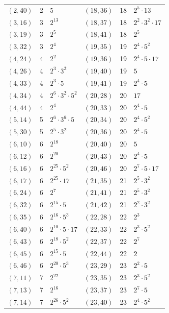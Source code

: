 \documentclass[11pt]{article}
\begin{document}
\begin{longtable}{@{}lrl@{\qquad}lrl@{}}
$(2,40)$ & 2 & $5$ & $(18,36)$ & 18 & $2^{5}\cdot 13$\\
$(3,16)$ & 3 & $2^{13}$ & $(18,37)$ & 18 & $2^{2}\cdot 3^{2}\cdot 17$\\
$(3,19)$ & 3 & $2^{5}$ & $(18,41)$ & 18 & $2^{5}$\\
$(3,32)$ & 3 & $2^{4}$ & $(19,35)$ & 19 & $2^{4}\cdot 5^{2}$\\
$(4,24)$ & 4 & $2^{2}$ & $(19,36)$ & 19 & $2^{4}\cdot 5\cdot 17$\\
$(4,26)$ & 4 & $2^{3}\cdot 3^{2}$ & $(19,40)$ & 19 & $5$\\
$(4,33)$ & 4 & $2^{3}\cdot 5$ & $(19,41)$ & 19 & $2^{4}\cdot 5$\\
$(4,34)$ & 4 & $2^{6}\cdot 3^{2}\cdot 5^{2}$ & $(20,28)$ & 20 & $17$\\
$(4,44)$ & 4 & $2^{4}$ & $(20,33)$ & 20 & $2^{4}\cdot 5$\\
$(5,14)$ & 5 & $2^{6}\cdot 3^{6}\cdot 5$ & $(20,34)$ & 20 & $2^{4}\cdot 5^{2}$\\
$(5,30)$ & 5 & $2^{5}\cdot 3^{2}$ & $(20,36)$ & 20 & $2^{4}\cdot 5$\\
$(6,10)$ & 6 & $2^{18}$ & $(20,40)$ & 20 & $5$\\
$(6,12)$ & 6 & $2^{20}$ & $(20,43)$ & 20 & $2^{4}\cdot 5$\\
$(6,16)$ & 6 & $2^{25}\cdot 5^{2}$ & $(20,46)$ & 20 & $2^{7}\cdot 5\cdot 17$\\
$(6,17)$ & 6 & $2^{25}\cdot 17$ & $(21,35)$ & 21 & $2^{5}\cdot 3^{2}$\\
$(6,24)$ & 6 & $2^{7}$ & $(21,41)$ & 21 & $2^{5}\cdot 3^{2}$\\
$(6,32)$ & 6 & $2^{15}\cdot 5$ & $(21,42)$ & 21 & $2^{2}\cdot 3^{2}$\\
$(6,35)$ & 6 & $2^{16}\cdot 5^{3}$ & $(22,28)$ & 22 & $2^{3}$\\
$(6,40)$ & 6 & $2^{10}\cdot 5\cdot 17$ & $(22,33)$ & 22 & $2^{3}\cdot 5^{2}$\\
$(6,43)$ & 6 & $2^{18}\cdot 5^{2}$ & $(22,37)$ & 22 & $2^{7}$\\
$(6,45)$ & 6 & $2^{15}\cdot 5$ & $(22,44)$ & 22 & $2$\\
$(6,46)$ & 6 & $2^{20}\cdot 5^{3}$ & $(23,29)$ & 23 & $2^{2}\cdot 5$\\
$(7,11)$ & 7 & $2^{22}$ & $(23,35)$ & 23 & $2^{3}\cdot 5^{2}$\\
$(7,13)$ & 7 & $2^{16}$ & $(23,37)$ & 23 & $2^{7}\cdot 5$\\
$(7,14)$ & 7 & $2^{26}\cdot 5^{2}$ & $(23,40)$ & 23 & $2^{4}\cdot 5^{2}$\\

\end{longtable}
\end{document}
